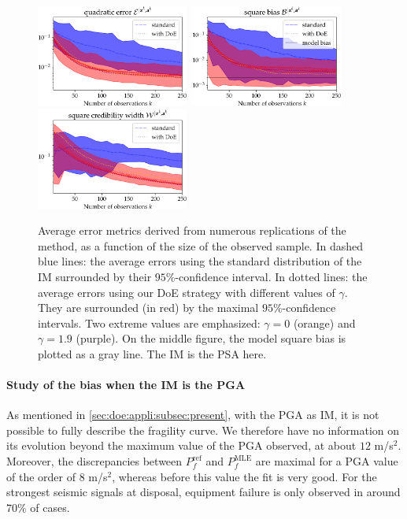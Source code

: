\begin{figure}[h]
    \centering%
    \includegraphics[width=5cm]{figures/DoE/errE_PSA.pdf}\ \includegraphics[width=5cm]{figures/DoE/errB_PSA.pdf}\ \includegraphics[width=5cm]{figures/DoE/errW_PSA.pdf}%
    \caption{Average error metrics derived from numerous replications of the method, as a function of the size of the observed sample.
    In dashed blue lines: the average errors using the standard distribution of the IM surrounded by their $95\%$-confidence interval. In dotted lines: the average errors using our DoE strategy with different values of $\gamma$. They are surrounded (in red) by the maximal $95\%$-confidence intervals. Two extreme values are emphasized: $\gamma=0$ (orange) and $\gamma=1.9$ (purple).
    On the middle figure, the model square bias is plotted as a gray line.
     The IM  is the PSA here.}
    \label{fig:doe:errors-psa}
\end{figure}



\paragraph{Study of the bias when the IM is the PGA}
{As mentioned in \cref{sec:doe:appli:subsec:present}, with the PGA as IM, it is not possible to fully describe the fragility curve. We therefore have no information on its evolution beyond the maximum value of the PGA observed, at about $12$ m/s$^2$. Moreover, the discrepancies between $P_f^{\text{ref}}$ and $P_f^{\text{MLE}}$ are maximal for a PGA value of the order of $8$ m/s$^2$, whereas before this value the fit is very good.} For the strongest seismic signals at disposal,
equipment failure is only observed in around $70\%$ of cases.

